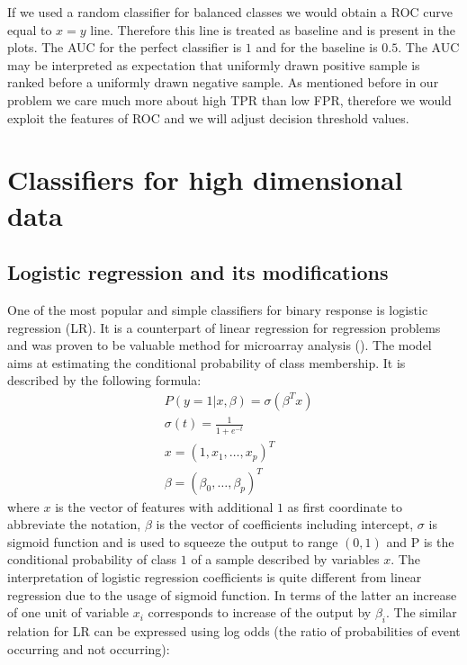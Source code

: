 \documentclass[shortabstract, english, mgr]{iithesis}
\begin{document}
If we used a random classifier for balanced classes we would obtain a ROC curve equal to $x=y$ line. Therefore this line is treated as baseline and is present in the plots. The AUC for the perfect classifier is $1$ and for the baseline is $0.5$. The AUC may be interpreted as expectation that uniformly drawn positive sample is ranked before a uniformly drawn negative sample. As mentioned before in our problem we care much more about high TPR than low FPR, therefore we would exploit the features of ROC and we will adjust decision threshold values.

\section{Classifiers for high dimensional data}

\subsection{Logistic regression and its modifications} \label{section:logit}

One of the most popular and simple classifiers for binary response is logistic regression (LR). It is a counterpart of linear regression for regression problems and was proven to be valuable method for microarray analysis (\cite{LRgene}). The model aims at estimating the conditional probability of class membership. It is described by the following formula:
\begin{align*}
    &P(y=1 | x, \beta)=\sigma\left(\beta^{T} x\right) \\
    &\sigma(t) = \frac{1}{1+e^{-t}} \\
    &x=(1, x_1, \ldots, x_p)^T \\
    &\beta = (\beta_0, \ldots, \beta_p)^T
\end{align*}
where $x$ is the vector of features with additional $1$ as first coordinate to abbreviate the notation, $\beta$ is the vector of coefficients including intercept, $\sigma$ is sigmoid function and is used to squeeze the output to range $(0,1)$ and P is the conditional probability of class $1$ of a sample described by variables $x$. The interpretation of logistic regression coefficients is quite different from linear regression due to the usage of sigmoid function. In terms of the latter an increase of one unit of variable $x_i$ corresponds to increase of the output by $\beta_i$. The similar relation for LR can be expressed using log odds (the ratio of probabilities of event occurring and not occurring):
\end{document}
